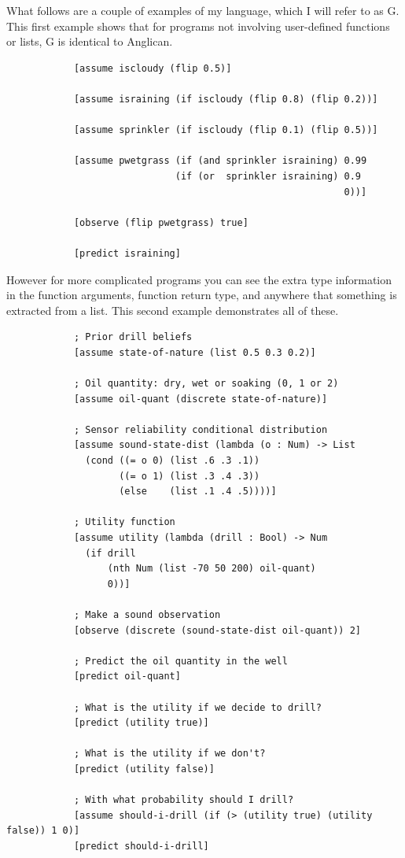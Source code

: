 \documentclass[a4paper]{article}
\begin{document}
What follows are a couple of examples of my language, which I will refer to as G. This first example shows that for programs not involving user-defined functions or lists, G is identical to Anglican.
\begin{center}
	\begin{varwidth}{\linewidth}
		\small
		\begin{verbatim}
			[assume iscloudy (flip 0.5)]
			
			[assume israining (if iscloudy (flip 0.8) (flip 0.2))]
			
			[assume sprinkler (if iscloudy (flip 0.1) (flip 0.5))]
			
			[assume pwetgrass (if (and sprinkler israining) 0.99
			                  (if (or  sprinkler israining) 0.9
			                                                0))]
			
			[observe (flip pwetgrass) true]
			
			[predict israining]
		\end{verbatim}
	\end{varwidth}
\end{center}
However for more complicated programs you can see the extra type information in the function arguments, function return type, and anywhere that something is extracted from a list. This second example demonstrates all of these.
\begin{center}
	\begin{varwidth}{\linewidth}
		\small
		\begin{verbatim}
			; Prior drill beliefs
			[assume state-of-nature (list 0.5 0.3 0.2)] 

			; Oil quantity: dry, wet or soaking (0, 1 or 2)
			[assume oil-quant (discrete state-of-nature)]

			; Sensor reliability conditional distribution
			[assume sound-state-dist (lambda (o : Num) -> List
			  (cond ((= o 0) (list .6 .3 .1))
			        ((= o 1) (list .3 .4 .3))
			        (else    (list .1 .4 .5))))]

			; Utility function 
			[assume utility (lambda (drill : Bool) -> Num 
			  (if drill
			      (nth Num (list -70 50 200) oil-quant)
			      0))]

			; Make a sound observation
			[observe (discrete (sound-state-dist oil-quant)) 2]

			; Predict the oil quantity in the well
			[predict oil-quant]

			; What is the utility if we decide to drill?
			[predict (utility true)]

			; What is the utility if we don't?
			[predict (utility false)]

			; With what probability should I drill?
			[assume should-i-drill (if (> (utility true) (utility false)) 1 0)]
			[predict should-i-drill]
		\end{verbatim}
	\end{varwidth}
\end{center}
\end{document}

